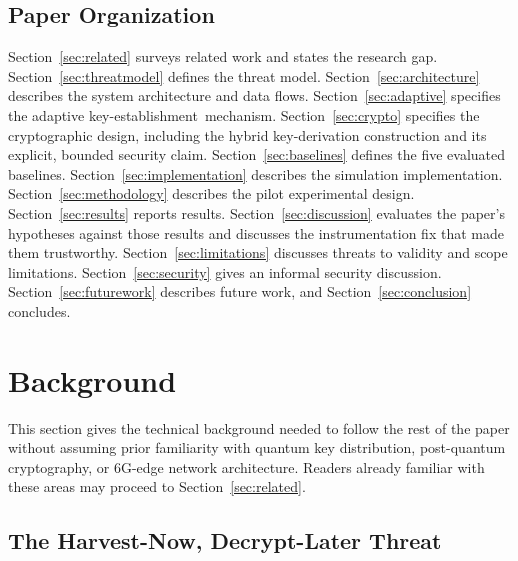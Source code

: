 \documentclass[journal]{IEEEtran}
\newcommand{\keyest}{key-establishment}
\begin{document}
\subsection{Paper Organization}

Section~\ref{sec:related} surveys related work and states the research gap. Section~\ref{sec:threatmodel} defines the threat model. Section~\ref{sec:architecture} describes the system architecture and data flows. Section~\ref{sec:adaptive} specifies the adaptive \keyest\ mechanism. Section~\ref{sec:crypto} specifies the cryptographic design, including the hybrid key-derivation construction and its explicit, bounded security claim. Section~\ref{sec:baselines} defines the five evaluated baselines. Section~\ref{sec:implementation} describes the simulation implementation. Section~\ref{sec:methodology} describes the pilot experimental design. Section~\ref{sec:results} reports results. Section~\ref{sec:discussion} evaluates the paper's hypotheses against those results and discusses the instrumentation fix that made them trustworthy. Section~\ref{sec:limitations} discusses threats to validity and scope limitations. Section~\ref{sec:security} gives an informal security discussion. Section~\ref{sec:futurework} describes future work, and Section~\ref{sec:conclusion} concludes.

\section{Background}
\label{sec:background}

This section gives the technical background needed to follow the rest of the paper without assuming prior familiarity with quantum key distribution, post-quantum cryptography, or 6G-edge network architecture. Readers already familiar with these areas may proceed to Section~\ref{sec:related}.

\subsection{The Harvest-Now, Decrypt-Later Threat}
\end{document}
